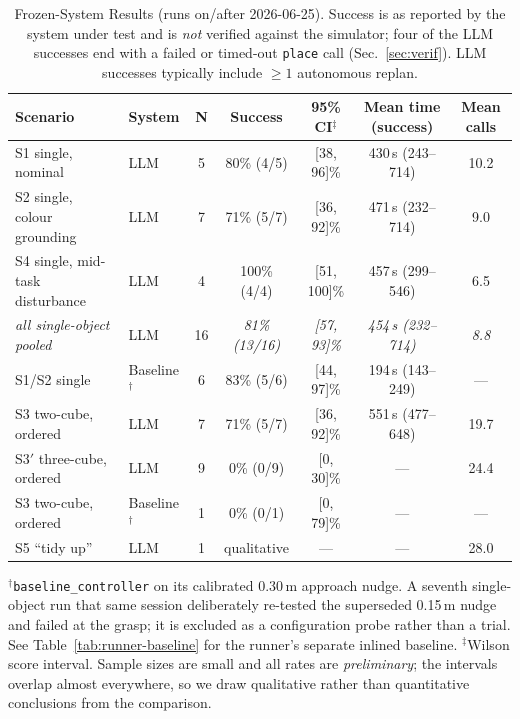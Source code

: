 \begin{table}[t]
\caption{Frozen-System Results (runs on/after 2026-06-25). Success is as
reported by the system under test and is \emph{not} verified against the
simulator; four of the LLM successes end with a failed or timed-out
\texttt{place} call (Sec.~\ref{sec:verif}). LLM successes typically include
$\geq 1$ autonomous replan.}
\label{tab:results}
\centering
\begin{tabular}{@{}llccccc@{}}
\toprule
\textbf{Scenario} & \textbf{System} & \textbf{N} & \textbf{Success} &
\textbf{95\% CI$^\ddagger$} & \textbf{Mean time (success)} & \textbf{Mean calls} \\ \midrule
S1 single, nominal        & LLM      & 5  & 80\% (4/5)    & [38, 96]\%  & 430\,s (243--714) & 10.2 \\
S2 single, colour grounding & LLM    & 7  & 71\% (5/7)    & [36, 92]\%  & 471\,s (232--714) & 9.0 \\
S4 single, mid-task disturbance & LLM & 4 & 100\% (4/4)   & [51, 100]\% & 457\,s (299--546) & 6.5 \\
\quad\emph{all single-object pooled} & LLM & 16 & \emph{81\% (13/16)} & \emph{[57, 93]\%} & \emph{454\,s (232--714)} & \emph{8.8} \\ \midrule
S1/S2 single              & Baseline$^{\dagger}$ & 6 & 83\% (5/6) & [44, 97]\% & 194\,s (143--249) & --- \\ \midrule
S3 two-cube, ordered      & LLM      & 7  & 71\% (5/7)    & [36, 92]\%  & 551\,s (477--648) & 19.7 \\
S3$'$ three-cube, ordered & LLM      & 9  & 0\% (0/9)     & [0, 30]\%   & ---               & 24.4 \\
S3 two-cube, ordered      & Baseline$^{\dagger}$ & 1 & 0\% (0/1) & [0, 79]\% & --- & --- \\ \midrule
S5 ``tidy up''            & LLM      & 1  & qualitative   & ---         & ---               & 28.0 \\ \bottomrule
\end{tabular}
\vspace{2pt}
\begin{flushleft}
\footnotesize
$^{\dagger}$\texttt{baseline\_controller} on its calibrated 0.30\,m approach
nudge. A seventh single-object run that same session deliberately re-tested
the superseded 0.15\,m nudge and failed at the grasp; it is excluded as a
configuration probe rather than a trial. See
Table~\ref{tab:runner-baseline} for the runner's separate inlined baseline.
$^{\ddagger}$Wilson score interval. Sample sizes are small and all rates are
\emph{preliminary}; the intervals overlap almost everywhere, so we draw
qualitative rather than quantitative conclusions from the comparison.
\end{flushleft}
\end{table}


